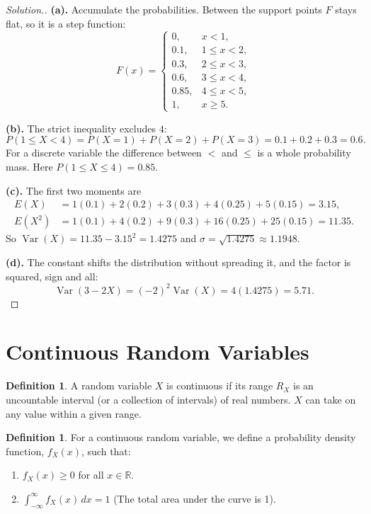 \documentclass[12pt,a4paper]{report}
\theoremstyle{definition}
\newtheorem{definition}[thm]{Definition}
\theoremstyle{plain}
\theoremstyle{definition}
\newenvironment{solution}
  {\renewcommand{\qedsymbol}{}\begin{proof}[\textit{Solution}.]}
  {\end{proof}}
\begin{document}
\begin{solution}
\textbf{(a).} Accumulate the probabilities. Between the support points $F$ stays flat, so
it is a step function:
\[F(x) = \begin{cases}
0, & x<1,\\
0.1, & 1\leq x<2,\\
0.3, & 2\leq x<3,\\
0.6, & 3\leq x<4,\\
0.85, & 4\leq x<5,\\
1, & x\geq 5.
\end{cases}\]

\textbf{(b).} The strict inequality excludes $4$:
\[P(1\leq X<4) = P(X=1)+P(X=2)+P(X=3) = 0.1+0.2+0.3 = 0.6.\]
For a discrete variable the difference between $<$ and $\leq$ is a whole probability
mass. Here $P(1\leq X\leq 4) = 0.85$.

\textbf{(c).} The first two moments are
\begin{align*}
E(X) &= 1(0.1)+2(0.2)+3(0.3)+4(0.25)+5(0.15) = 3.15,\\
E(X^{2}) &= 1(0.1)+4(0.2)+9(0.3)+16(0.25)+25(0.15) = 11.35.
\end{align*}
So $\operatorname{Var}(X) = 11.35-3.15^{2} = 1.4275$ and
$\sigma = \sqrt{1.4275}\approx 1.1948$.

\textbf{(d).} The constant shifts the distribution without spreading it, and the factor
is squared, sign and all:
\[\operatorname{Var}(3-2X) = (-2)^{2}\operatorname{Var}(X) = 4(1.4275) = 5.71.\]
\end{solution}


\section{Continuous Random Variables}
\vspace{-15pt}

\begin{definition}
A random variable $X$ is continuous if its range $R_X$ is an uncountable interval (or a collection of intervals) of real numbers. $X$ can take on any value within a given range.
\end{definition}


\begin{definition}
For a continuous random variable, we define a probability density function, $f_X(x)$, such that:
\begin{enumerate}
\item $f_X(x) \geq 0$ for all $x \in \mathbb{R}$.
\item $\int_{-\infty}^{\infty} f_X(x) \, dx = 1$ (The total area under the curve is 1).
\end{enumerate}
\end{definition}
\end{document}
